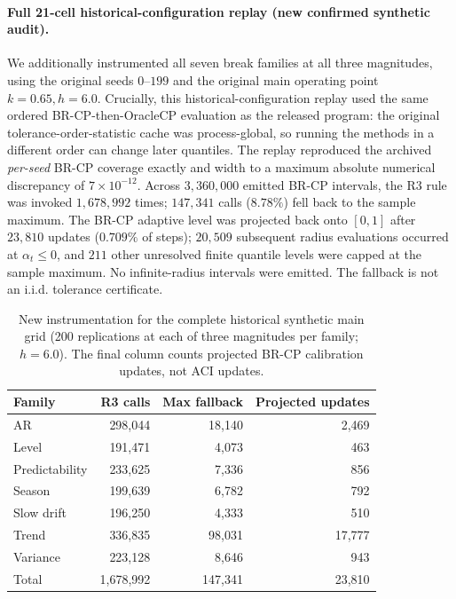 \documentclass[10pt]{article}
\begin{document}
\paragraph{Full 21-cell historical-configuration replay (new confirmed synthetic audit).}
We additionally instrumented all seven break families at all three magnitudes,
using the original seeds $0$--$199$ and the original main operating point
$k=0.65,h=6.0$. Crucially, this historical-configuration replay used the
same ordered BR-CP-then-OracleCP evaluation as the released program: the
original tolerance-order-statistic cache was process-global, so running the
methods in a different order can change later quantiles. The replay
reproduced the archived \emph{per-seed} BR-CP coverage exactly and width to a
maximum absolute numerical discrepancy of $7\times10^{-12}$.
Across $3{,}360{,}000$ emitted BR-CP intervals, the R3 rule was invoked
$1{,}678{,}992$ times; $147{,}341$ calls ($8.78\%$) fell back to the sample
maximum. The BR-CP adaptive level was projected back onto $[0,1]$ after
$23{,}810$ updates ($0.709\%$ of steps); $20{,}509$ subsequent radius
evaluations occurred at $\alpha_t\le0$, and $211$ other unresolved finite
quantile levels were capped at the sample maximum. No infinite-radius
intervals were emitted. The fallback is not an i.i.d. tolerance certificate.
\begin{table}[t]
\centering\small
\caption{New instrumentation for the complete historical synthetic main grid
(200 replications at each of three magnitudes per family; $h=6.0$).
The final column counts projected BR-CP calibration updates, not ACI updates.}
\label{tab:full-wilks}
\begin{tabular}{lrrr}
\toprule
Family & R3 calls & Max fallback & Projected updates \\
\midrule
AR & 298,044 & 18,140 & 2,469 \\
Level & 191,471 & 4,073 & 463 \\
Predictability & 233,625 & 7,336 & 856 \\
Season & 199,639 & 6,782 & 792 \\
Slow drift & 196,250 & 4,333 & 510 \\
Trend & 336,835 & 98,031 & 17,777 \\
Variance & 223,128 & 8,646 & 943 \\
\midrule
Total & 1,678,992 & 147,341 & 23,810 \\
\bottomrule
\end{tabular}
\end{table}
\end{document}
